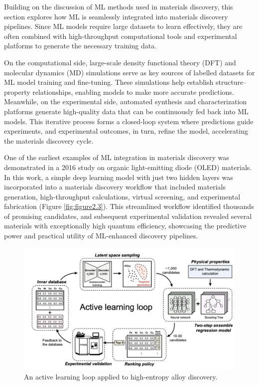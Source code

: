 Building on the discussion of ML methods used in materials discovery, this section explores how ML is seamlessly integrated into materials discovery pipelines. Since ML models require large datasets to learn effectively, they are often combined with high-throughput computational tools and experimental platforms to generate the necessary training data.

On the computational side, large-scale density functional theory (DFT) and molecular dynamics (MD) simulations serve as key sources of labelled datasets for ML model training and fine-tuning. These simulations help establish structure–property relationships, enabling models to make more accurate predictions. Meanwhile, on the experimental side, automated synthesis and characterization platforms generate high-quality data that can be continuously fed back into ML models. This iterative process forms a closed-loop system where predictions guide experiments, and experimental outcomes, in turn, refine the model, accelerating the materials discovery cycle.

One of the earliest examples of ML integration in materials discovery was demonstrated in a 2016 study on organic light-emitting diode (OLED) materials\cite{RN66}. In this work, a simple deep learning model with just two hidden layers was incorporated into a materials discovery workflow that included materials generation, high-throughput calculations, virtual screening, and experimental fabrication (Figure \ref{fig:figure2.3}). This streamlined workflow identified thousands of promising candidates, and subsequent experimental validation revealed several materials with exceptionally high quantum efficiency, showcasing the predictive power and practical utility of ML-enhanced discovery pipelines.

\begin{figure}[ht]
    \centering
    \includegraphics[width=\textwidth]{figures/literature-review/figure2-4.png}
    \caption{An active learning loop applied to high-entropy alloy discovery\cite{RN532}.}
    \label{fig:figure2.4}
\end{figure}

